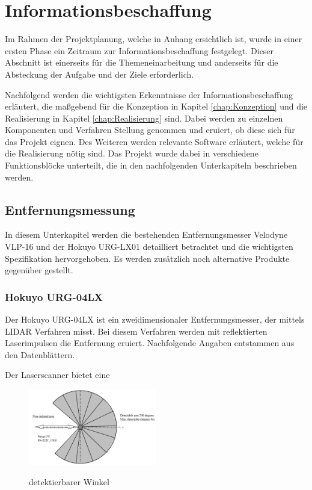 \chapter{Informationsbeschaffung}
\label{Informationsbeschaffung}
Im Rahmen der Projektplanung, welche in Anhang  ersichtlich ist, wurde in einer ersten Phase ein Zeitraum zur Informationsbeschaffung festgelegt. Dieser Abschnitt ist einerseits für die Themeneinarbeitung und anderseits für die Absteckung der Aufgabe und der Ziele erforderlich.

Nachfolgend werden die wichtigsten Erkenntnisse der Informationsbeschaffung erläutert, die maßgebend für die Konzeption in Kapitel \ref{chap:Konzeption} und die Realisierung in Kapitel \ref{chap:Realisierung} sind. Dabei werden zu einzelnen Komponenten und Verfahren Stellung genommen und eruiert, ob diese sich für das Projekt eignen. Des Weiteren werden relevante Software erläutert, welche für die Realisierung nötig sind. Das Projekt wurde dabei in verschiedene Funktionsblöcke unterteilt, die in den nachfolgenden Unterkapiteln beschrieben werden.


\section{Entfernungsmessung}
\label{sec:Entfernungsmessung}
In diesem Unterkapitel werden die bestehenden Entfernungsmesser Velodyne VLP-16 und der Hokuyo URG-LX01 detailliert betrachtet und die wichtigsten Spezifikation hervorgehoben. Es werden zusätzlich noch alternative Produkte gegenüber gestellt.

\subsection{Hokuyo URG-04LX}
\label{subsec:Hokuyo}
Der Hokuyo URG-04LX ist ein zweidimensionaler Entfernungsmesser, der mittels \ac{LIDAR} Verfahren misst. Bei diesem Verfahren werden mit reflektierten Laserimpulsen die Entfernung eruiert. Nachfolgende Angaben entstammen aus den Datenblättern.  

Der Laserscanner bietet eine 

\begin{figure}[H]
	\centering
	\includegraphics[width=0.5\textwidth]
	{resources/detectableAngle.PNG}
	\caption[detektierbarer Winkel]{detektierbarer Winkel} \protect\cite{Hokuyo}
	\label{fig:URG-04LX}
\end{figure}

